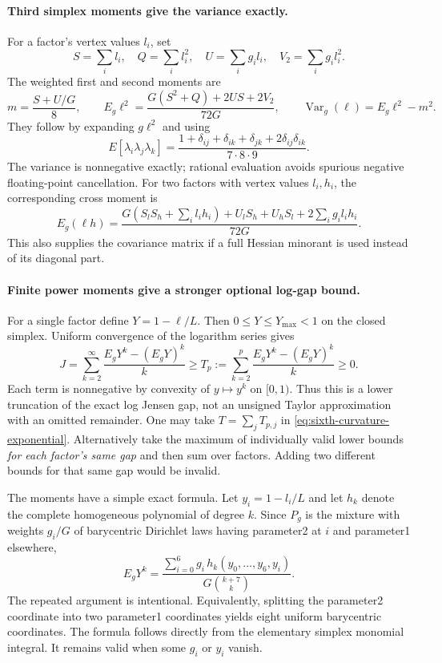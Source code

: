 \paragraph{Third simplex moments give the variance exactly.}
For a factor's vertex values $l_i$, set
\[
 S=\sum_i l_i,\quad Q=\sum_i l_i^2,\quad
 U=\sum_i g_i l_i,\quad V_2=\sum_i g_i l_i^2.
\]
The weighted first and second moments are
\begin{equation}\label{eq:sixth-curvature-variance}
 m=\frac{S+U/G}{8},\qquad
 E_g\ell^2=\frac{G(S^2+Q)+2US+2V_2}{72G},
 \qquad\operatorname{Var}_g(\ell)=E_g\ell^2-m^2.
\end{equation}
They follow by expanding $g\ell^2$ and using
\[
 E[\lambda_i\lambda_j\lambda_k]
 =\frac{1+\delta_{ij}+\delta_{ik}+\delta_{jk}
                   +2\delta_{ij}\delta_{ik}}{7\cdot8\cdot9}.
\]
The variance is nonnegative exactly; rational evaluation avoids
spurious negative floating-point cancellation. For two factors with
vertex values $l_i,h_i$, the corresponding cross moment is
\[
 E_g(\ell h)=
 \frac{G(S_lS_h+\sum_i l_ih_i)+U_lS_h+U_hS_l
                      +2\sum_i g_i l_i h_i}{72G}.
\]
This also supplies the covariance matrix if a full Hessian minorant
is used instead of its diagonal part.

\paragraph{Finite power moments give a stronger optional log-gap bound.}
For a single factor define $Y=1-\ell/L$. Then $0\le Y\le Y_{\max}<1$
on the closed simplex. Uniform convergence of the logarithm series gives
\begin{equation}\label{eq:sixth-curvature-log-moment}
 J=\sum_{k=2}^{\infty}\frac{E_gY^k-(E_gY)^k}{k}
 \ge T_p:=\sum_{k=2}^{p}\frac{E_gY^k-(E_gY)^k}{k}\ge0.
\end{equation}
Each term is nonnegative by convexity of $y\mapsto y^k$ on $[0,1)$.
Thus this is a lower truncation of the exact log Jensen gap, not an
unsigned Taylor approximation with an omitted remainder. One may
take $T=\sum_jT_{p,j}$ in \eqref{eq:sixth-curvature-exponential}.
Alternatively take the maximum of individually valid lower bounds
\emph{for each factor's same gap} and then sum over factors. Adding
two different bounds for that same gap would be invalid.

The moments have a simple exact formula. Let $y_i=1-l_i/L$ and let
$h_k$ denote the complete homogeneous polynomial of degree $k$.
Since $P_g$ is the mixture with weights $g_i/G$ of barycentric
Dirichlet laws having parameter2 at $i$ and parameter1 elsewhere,
\begin{equation}\label{eq:sixth-curvature-duplicated-vertex}
 E_gY^k=
 \frac{\sum_{i=0}^6g_i\,
      h_k(y_0,\ldots,y_6,y_i)}{G\binom{k+7}{k}}.
\end{equation}
The repeated argument is intentional. Equivalently, splitting the
parameter2 coordinate into two parameter1 coordinates yields eight
uniform barycentric coordinates. The formula follows directly from
the elementary simplex monomial integral. It remains valid when
some $g_i$ or $y_i$ vanish.

